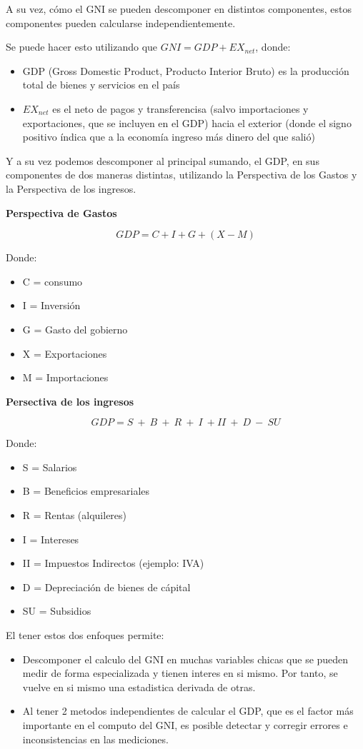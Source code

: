 A su vez, cómo el GNI se pueden descomponer en distintos componentes, estos componentes pueden calcularse independientemente.

Se puede hacer esto utilizando que $GNI = GDP + EX_{net}$, donde:
\begin{itemize}
    \item GDP (Gross Domestic Product, Producto Interior Bruto) es la producción total de bienes y servicios en el país
    \item $EX_{net}$ es el neto de pagos y transferencisa (salvo importaciones y exportaciones, que se incluyen en el GDP) hacia el exterior (donde el signo positivo índica que a la economía ingreso más dinero del que salió)
\end{itemize}

Y a su vez podemos descomponer al principal sumando, el GDP, en sus componentes de dos maneras distintas, utilizando la Perspectiva de los Gastos y la Perspectiva de los ingresos.

\textbf{Perspectiva de Gastos}

$$
GDP = C + I + G + (X-M)
$$

Donde:
\begin{itemize}
    \item C = consumo
    \item I = Inversión
    \item G = Gasto del gobierno
    \item X = Exportaciones
    \item M = Importaciones
\end{itemize}

\textbf{Persectiva de los ingresos}

$$
GDP = S\ +\ B\ +\ R\ +\ I\ + II\ +\ D\ -\ SU 
$$

Donde:
\begin{itemize}
    \item S = Salarios
    \item B = Beneficios empresariales
    \item R = Rentas (alquileres)
    \item I = Intereses
    \item II = Impuestos Indirectos (ejemplo: IVA)
    \item D = Depreciación de bienes de cápital
    \item SU = Subsidios
\end{itemize}

El tener estos dos enfoques permite:

\begin{itemize}
    \item Descomponer el calculo del GNI en muchas variables chicas que se pueden medir de forma especializada y tienen interes en si mismo. Por tanto, se vuelve en si mismo una estadistica derivada de otras.
    \item Al tener 2 metodos independientes de calcular el GDP, que es el factor más importante en el computo del GNI, es posible detectar y corregir errores e inconsistencias en las mediciones.
\end{itemize}

